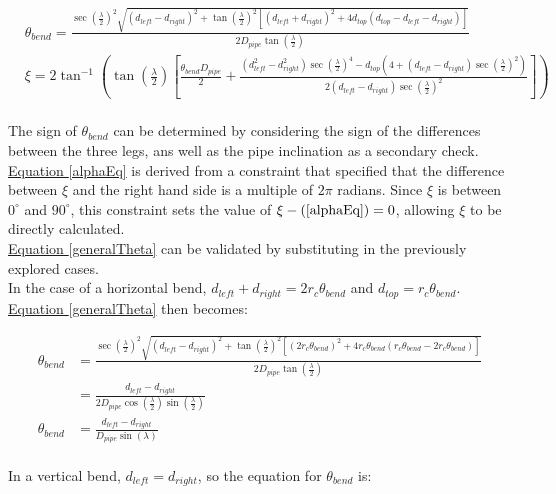 \documentclass[11pt]{article}		%
\newcommand{\equationref}[1]{\hyperref[#1]{Equation \ref*{#1}}}     %
\begin{document}
			\begin{align}
				&\theta_{bend} = \frac{ \sec \left( \frac{\lambda}{2} \right)^2 \sqrt{ \left( d_{left} - d_{right} \right)^2 +  \tan \left( \frac{\lambda}{2} \right)^2 \left[ \left( d_{left} + d_{right} \right)^2 + 4 d_{top} \left( d_{top} - d_{left} - d_{right} \right) \right] } }{2 D_{pipe} \tan \left( \frac{\lambda}{2} \right)} \label{generalTheta}
				\\
				&\xi = 2 \tan^{-1} \left( \tan \left( \frac{\lambda}{2} \right) \left[\frac{ \theta_{bend} D_{pipe}}{2} + \frac{\left( d_{left}^2 - d_{right}^2 \right) \sec \left( \frac{\lambda}{2} \right)^4 - d_{top} \left(4 + \left( d_{left} - d_{right} \right) \sec \left( \frac{\lambda}{2} \right)^2 \right)}{2 \left( d_{left} - d_{right} \right) \sec \left( \frac{\lambda}{2} \right)^2} \right] \right) \label{alphaEq}
			\end{align}
			\\
	        \hspace*{2ex}The sign of $\theta_{bend}$ can be determined by considering the sign of the differences between the three legs, ans well as the pipe inclination as a secondary check.
			\\
	        \hspace*{2ex}\equationref{alphaEq} is derived from a constraint that specified that the difference between $\xi$ and the right hand side is a multiple of $2 \pi$ radians.
			Since $\xi$ is between $0^\circ$ and $90^\circ$, this constraint sets the value of $\xi - (\ref*{alphaEq}) = 0$, allowing $\xi$ to be directly calculated.
			\\
	        \hspace*{2ex}\equationref{generalTheta} can be validated by substituting in the previously explored cases.
\\
	        \hspace*{2ex}In the case of a horizontal bend, $d_{left} + d_{right} = 2 r_c \theta_{bend} $ and $d_{top} = r_c \theta_{bend}$.
			\equationref{generalTheta} then becomes:
			
			\begin{align*}
				\theta_{bend} &= \frac{ \sec \left( \frac{\lambda}{2} \right)^2 \sqrt{ \left( d_{left} - d_{right} \right)^2 +  \tan \left( \frac{\lambda}{2} \right)^2 \left[ \left( 2 r_c \theta_{bend} \right)^2 + 4 r_c \theta_{bend} \left( r_c \theta_{bend}  - 2 r_c \theta_{bend} \right) \right] } }{2 D_{pipe} \tan \left( \frac{\lambda}{2} \right)}
				\\
				&= \frac{d_{left} - d_{right}}{2 D_{pipe} \cos \left( \frac{\lambda}{2} \right) \sin \left( \frac{\lambda}{2} \right)}
				\\
				\theta_{bend} &= \frac{d_{left} - d_{right}}{D_{pipe} \sin \left( \lambda \right)}
			\end{align*}
			\\
	        \hspace*{2ex}In a vertical bend, $d_{left} = d_{right}$, so the equation for $\theta_{bend}$ is:
			
\end{document}

